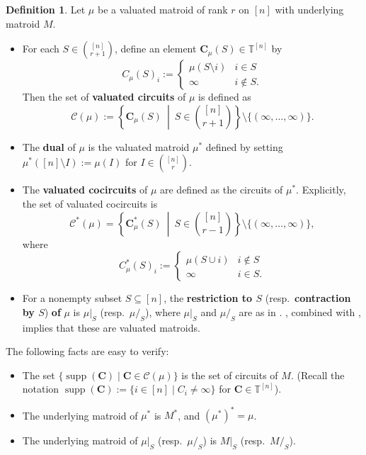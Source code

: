 \documentclass[11pt]{amsart}
\newcommand{\TT}{\mathbb T}
\theoremstyle{definition}
\newtheorem{defn}[thm]{Definition}
\begin{document}
\begin{defn}\label{defn:valuatedcircuits}
Let $\mu$ be a valuated matroid of rank $r$ on $[n]$ with underlying matroid $M$.  
\begin{itemize}
\item For each $S\in \binom{[n]}{r+1}$, define an element $\mathbf C_\mu(S) \in \TT^{[n]}$ by
\[
C_\mu(S)_i :=
\begin{cases} \mu(S\setminus i) & i\in S\\
\infty & i\notin S.
\end{cases}
\]
Then the set of \textbf{valuated circuits} of $\mu$ is defined as
\[
\mathcal C(\mu) := \left\{ \mathbf C_\mu(S) \ \middle | \ S \in \textstyle \binom{[n]}{r+1}\right\} \setminus \{(\infty, \ldots, \infty)\}.
\]
\item The \textbf{dual} of $\mu$ is the valuated matroid $\mu^*$ defined by setting $\mu^*([n]\setminus I) := \mu(I)$ for $I\in \binom{[n]}{r}$.
\item The \textbf{valuated cocircuits} of $\mu$ are defined as the circuits of $\mu^*$.  Explicitly, the set of valuated cocircuits is
\[
\mathcal C^*(\mu) = \left\{\mathbf{C}_\mu^*(S) \ \middle | \ S\in \textstyle \binom{[n]}{r-1}\right\} \setminus \{(\infty, \ldots, \infty)\},
\]
where
\[
C_\mu^*(S)_i:=
\begin{cases} \mu({S\cup i}) & i\not\in S\\
\infty & i\in S.
\end{cases}
\]
\item For a nonempty subset $S\subseteq [n]$, the \textbf{restriction to $S$} (resp.\ \textbf{contraction by $S$}) \textbf{of} $\mu$ is $\mu|_S$ (resp.\ $\mu/_S$), where $\mu|_S$ and $\mu/_S$ are as in . , combined with , implies that these are valuated matroids.
\end{itemize}
\end{defn}

The following facts are easy to verify:
\begin{itemize}
\item The set $\{\operatorname{supp}(\mathbf C) \mid \mathbf C \in \mathcal C(\mu)\}$ is the set of circuits of $M$. (Recall the notation $\operatorname{supp}(\mathbf C) := \{i\in [n] \mid C_i \neq \infty\}$ for $\mathbf C \in \TT^{[n]}$).
\item The underlying matroid of $\mu^*$ is $M^*$, and $(\mu^*)^* = \mu$.
\item The underlying matroid of $\mu|_S$ (resp.\ $\mu/_S$) is $M|_S$ (resp.\ $M/_S$).
\end{itemize}
\end{document}
